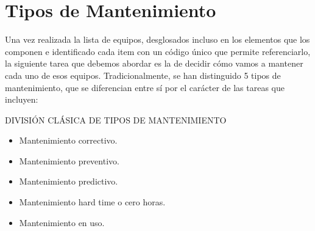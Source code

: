 \documentclass[../main]{subfiles}
\begin{document}
\section{Tipos de Mantenimiento}

Una vez realizada la lista de equipos, desglosados incluso en los elementos que los componen e identificado cada item con un código único que
permite referenciarlo, la siguiente tarea que debemos abordar es la de decidir
cómo vamos a mantener cada uno de esos equipos.
Tradicionalmente, se han distinguido 5 tipos de mantenimiento, que se diferencian entre sí por el carácter de las tareas que incluyen:

\begin{tcolorbox}[]
DIVISIÓN CLÁSICA DE TIPOS DE MANTENIMIENTO
\tcblower
\begin{itemize}
\item Mantenimiento correctivo.
\item Mantenimiento preventivo.
\item Mantenimiento predictivo.
\item Mantenimiento hard time o cero horas.
\item Mantenimiento en uso.
\end{itemize}
\end{tcolorbox}
\end{document}
